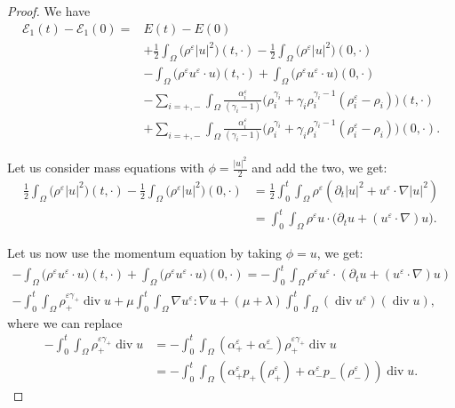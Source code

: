 \documentclass[11pt, twoside, a4paper]{article}
\theoremstyle{plain}
\theoremstyle{remark}
\numberwithin{equation}{section}
\def\EE{{\mathcal E}}
\renewcommand{\div}{\operatorname{div}}
\renewcommand{\epsilon}{\varepsilon}
\newcommand{\eps}{\varepsilon}
\begin{document}
\begin{appendices}
\begin{proof}
We have
\begin{equation}\label{relentropy}
 \begin{aligned}
 \EE_1(t) - \EE_1(0) =& E(t) - E(0) \\
 &+\frac{1}{2} \int_{\Omega} \Big(\rho^\eps |u|^2\Big)(t,\cdot) - \frac{1}{2} \int_{\Omega} \Big(\rho^\eps |u|^2\Big)(0,\cdot) \\
 &- \int_{\Omega} \Big(\rho^\eps u^\eps \cdot u\Big)(t,\cdot) + \int_{\Omega} \Big(\rho^\eps u^\eps \cdot u\Big)(0,\cdot) \\
 &-\sum_{i=+,-} \int_{\Omega} \frac{\alpha_i^{\epsilon}}{(\gamma_i -1)} \Big(\rho_i^{\gamma_i} + \gamma_i \rho_i^{\gamma_i-1}(\rho_i^{\epsilon}-\rho_i) \Big)(t,\cdot)\\
 & +\sum_{i=+,-} \int_{\Omega} \frac{\alpha_i^{\epsilon}}{(\gamma_i -1)} \Big(\rho_i^{\gamma_i} + \gamma_i \rho_i^{\gamma_i-1}(\rho_i^{\epsilon}-\rho_i) \Big)(0,\cdot).
 \end{aligned}
\end{equation}

Let us consider mass equations with $\phi=\frac{|u|^2}{2}$ and add the two, we get:
\begin{align*}
 \frac{1}{2} \int_{\Omega} \Big(\rho^\eps |u|^2\Big)(t,\cdot) - \frac{1}{2} \int_{\Omega} \Big(\rho^\eps |u|^2\Big)(0,\cdot) 
 &=\frac{1}{2} \int_0^t\!\!\!\int_{\Omega} \rho^\eps \left(\partial_t|u|^2+u^\eps \cdot \nabla |u|^2\right) \nonumber \\
&= \int_0^t \!\!\!\int_\Omega \rho^\eps u\cdot \Big(\partial_t u + (u^{\epsilon} \cdot \nabla) u\Big).
\end{align*}


Let us now use the momentum equation by taking $\phi=u$, we get:
\begin{multline*}
 -\int_{\Omega} \Big(\rho^\eps u^\eps \cdot u\Big)(t,\cdot) + \int_{\Omega} \Big(\rho^\eps u^\eps \cdot u\Big)(0,\cdot) = -\int_0^t\!\!\!\int_{\Omega}\rho^\eps u^{\varepsilon} \cdot (\partial_t u + (u^{\varepsilon} \cdot \nabla) u )
 \\
 - \int_0^t\!\!\! \int_{\Omega} \rho_{+}^{\varepsilon \gamma_+}\div u 
 +\mu \int_0^t\!\!\!\int_{\Omega} \nabla u^{\varepsilon} : \nabla u + (\mu+\lambda) \int_0^t\!\!\!\int_{\Omega} \left(\operatorname{div} u^{\varepsilon}\right)(\operatorname{div} u),
\end{multline*}
where we can replace
\begin{align*}
- \int_0^t\!\!\! \int_{\Omega} \rho_{+}^{\varepsilon \gamma_+}\div u 
&=
- \int_0^t\!\!\! \int_{\Omega}(\alpha_+^\eps+\alpha_-^\eps) \rho_{+}^{\varepsilon \gamma_+}\div u \\
& = - \int_0^t\!\!\! \int_{\Omega}(\alpha_+^\eps p_+ (\rho_+^\eps) +\alpha_-^\eps p_-(\rho_-^\eps) )\div u .
\end{align*}



\end{proof}
\end{appendices}
\end{document}
